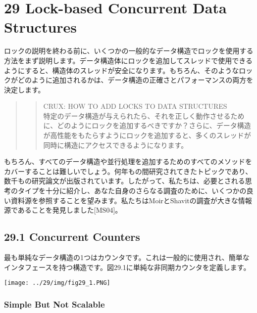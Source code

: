 \newpage

\hypertarget{lock-based-concurrent-data-structures}{%
\section*{29 Lock-based Concurrent Data
Structures}\label{lock-based-concurrent-data-structures}}

ロックの説明を終わる前に、いくつかの一般的なデータ構造でロックを使用する方法をまず説明します。データ構造体にロックを追加してスレッドで使用できるようにすると、構造体のスレッドが安全になります。もちろん、そのようなロックがどのように追加されるかは、データ構造の正確さとパフォーマンスの両方を決定します。

\begin{quote}
\begin{quote}
CRUX: HOW TO ADD LOCKS TO DATA STRUCTURES\\
特定のデータ構造が与えられたら、それを正しく動作させるために、どのようにロックを追加するべきですか？さらに、データ構造が高性能をもたらすようにロックを追加すると、多くのスレッドが同時に構造にアクセスできるようになります。
\end{quote}
\end{quote}

もちろん、すべてのデータ構造や並行処理を追加するためのすべてのメソッドをカバーすることは難しいでしょう。何年もの間研究されてきたトピックであり、数千もの研究論文が出版されています。したがって、私たちは、必要とされる思考のタイプを十分に紹介し、あなた自身のさらなる調査のために、いくつかの良い資料源を参照することを望みます。私たちはMoirとShavitの調査が大きな情報源であることを発見しました{[}MS04{]}。

\hypertarget{concurrent-counters}{%
\subsection*{29.1 Concurrent Counters}\label{concurrent-counters}}

最も単純なデータ構造の1つはカウンタです。これは一般的に使用され、簡単なインタフェースを持つ構造です。図29.1に単純な非同期カウンタを定義します。

\texttt{[image: ../29/img/fig29\_1.PNG]}

\hypertarget{simple-but-not-scalable}{%
\subsubsection*{Simple But Not Scalable}\label{simple-but-not-scalable}}

